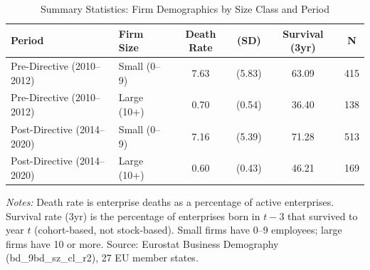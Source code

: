 \begin{table}[htbp]
\centering
\caption{Summary Statistics: Firm Demographics by Size Class and Period}
\label{tab:summary}
\begin{tabular}{llcccc}
\hline\hline
Period & Firm Size & Death Rate & (SD) & Survival (3yr) & N \\
\hline
Pre-Directive (2010--2012) & Small (0--9) & 7.63 & (5.83) & 63.09 & 415 \\
Pre-Directive (2010--2012) & Large (10+) & 0.70 & (0.54) & 36.40 & 138 \\
\hline
Post-Directive (2014--2020) & Small (0--9) & 7.16 & (5.39) & 71.28 & 513 \\
Post-Directive (2014--2020) & Large (10+) & 0.60 & (0.43) & 46.21 & 169 \\
\hline\hline
\end{tabular}
\begin{tablenotes}[flushleft]\footnotesize
\item \textit{Notes:} Death rate is enterprise deaths as a percentage of active enterprises. Survival rate (3yr) is the percentage of enterprises born in $t-3$ that survived to year $t$ (cohort-based, not stock-based). Small firms have 0--9 employees; large firms have 10 or more. Source: Eurostat Business Demography (bd\_9bd\_sz\_cl\_r2), 27 EU member states.
\end{tablenotes}
\end{table}
